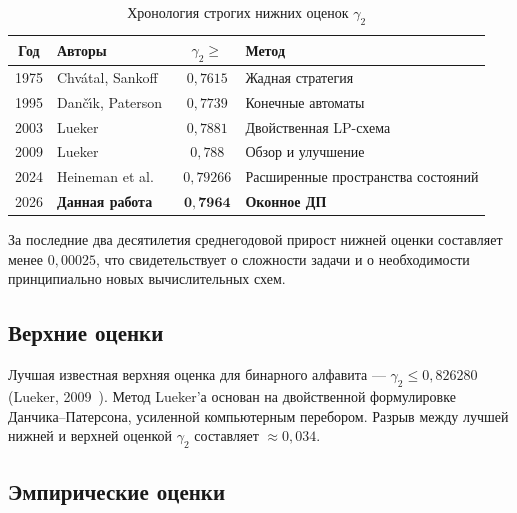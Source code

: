 \begin{table}[h!]
\caption{Хронология строгих нижних оценок $\gamma_2$}
\label{tab:history-gamma2}
\centering
\begin{tabular}{|c|l|c|l|}
\hline
Год  & Авторы                            & $\gamma_2 \geq$    & Метод \\
\hline
1975 & Chv\'atal, Sankoff~\cite{chvatal1975}      & $0{,}7615$  & Жадная стратегия \\
1995 & Dan\v{c}\'\i k, Paterson~\cite{dancik1995} & $0{,}7739$  & Конечные автоматы \\
2003 & Lueker~\cite{lueker2003}                   & $0{,}7881$  & Двойственная LP-схема \\
2009 & Lueker~\cite{lueker2009}                   & $0{,}788$   & Обзор и улучшение \\
2024 & Heineman et al.~\cite{heineman2024}        & $0{,}79266$ & Расширенные пространства состояний \\
2026 & \textbf{Данная работа}             & $\mathbf{0{,}7964}$ & \textbf{Оконное ДП} \\
\hline
\end{tabular}
\end{table}

За последние два десятилетия среднегодовой прирост нижней оценки составляет менее $0{,}00025$, что свидетельствует о сложности задачи и о необходимости принципиально новых вычислительных схем.

\subsection{Верхние оценки}

Лучшая известная верхняя оценка для бинарного алфавита --- $\gamma_2 \leq 0{,}826280$ (Lueker, 2009~\cite{lueker2009}). Метод Lueker'а основан на двойственной формулировке Данчика--Патерсона, усиленной компьютерным перебором. Разрыв между лучшей нижней и верхней оценкой $\gamma_2$ составляет $\approx 0{,}034$.

\subsection{Эмпирические оценки}

